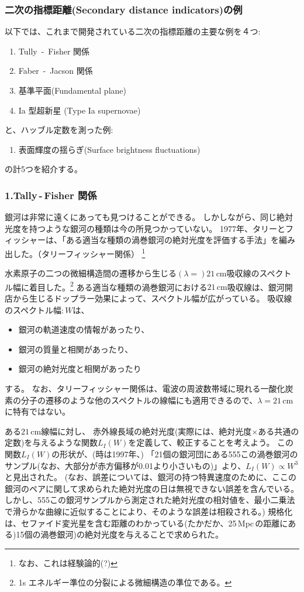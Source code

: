 \documentclass[11pt]{ltjsarticle}
\theoremstyle{plain}
\theoremstyle{break}
\begin{document}
\subsubsection{二次の指標距離(Secondary distance indicators)の例}
以下では、これまで開発されている二次の指標距離の主要な例を４つ:
\begin{enumerate}
  \item Tully \,-\, Fisher 関係
  \item Faber \,-\, Jacson 関係
  \item 基準平面(Fundamental plane)
  \item Ia 型超新星 (Type Ia supernovae)
\end{enumerate}
と、ハッブル定数を測った例:
\begin{enumerate}[4]
  \item 表面輝度の揺らぎ(Surface brightness fluctuations)
\end{enumerate}
の計5つを紹介する。

\subsubsection*{1.Tally\,-\,Fisher 関係}
銀河は非常に遠くにあっても見つけることができる。
しかしながら、同じ絶対光度を持つような銀河の種類は今の所見つかっていない。
1977年、タリーとフィッシャーは、「ある適当な種類の渦巻銀河の絶対光度を評価する手法」を編み出した。（タリーフィッシャー関係）
\footnote{なお、これは経験論的(?)}

水素原子の二つの微細構造間の遷移から生じる$(\lambda = ) 21\,\mathrm{cm}$吸収線のスペクトル幅に着目した。\footnote{1s エネルギー準位の分裂による微細構造の準位である。}
ある適当な種類の渦巻銀河における$21\,\mathrm{cm}$吸収線は、銀河開店から生じるドップラー効果によって、スペクトル幅が広がっている。
吸収線のスペクトル幅$:W$は、
\begin{itemize}
  \item 銀河の軌道速度の情報があったり、
  \item 銀河の質量と相関があったり、
  \item 銀河の絶対光度と相関があったり
\end{itemize}
する。
なお、タリーフィッシャー関係は、電波の周波数帯域に現れる一酸化炭素の分子の遷移のような他のスペクトルの線幅にも適用できるので、$\lambda = 21 \, \mathrm{cm}$に特有ではない。
\begin{flushleft}
\end{flushleft}
ある$21 \, \mathrm{cm}$線幅に対し、
赤外線長域の絶対光度(実際には、絶対光度$\times$ある共通の定数)を与えるような関数$L_I(W)$を定義して、較正することを考えよう。
この関数$L_I(W)$の形状が、(時は1997年、)
「21個の銀河団にある555この渦巻銀河のサンプル(なお、大部分が赤方偏移が0.01より小さいもの)」より、$L_I(W) \propto W^3$と見出された。
(なお、誤差については、銀河の持つ特異速度のために、ここの銀河のペアに関して求められた絶対光度の日は無視できない誤差を含んでいる。
しかし、555この銀河サンプルから測定された絶対光度の相対値を、最小二乗法で滑らかな曲線に近似することにより、そのような誤差は相殺される。)
規格化は、セファイド変光星を含む距離のわかっている(たかだか、25\,Mpc\,の距離にある)15個の渦巻銀河)の絶対光度を与えることで求められた。
\end{document}
